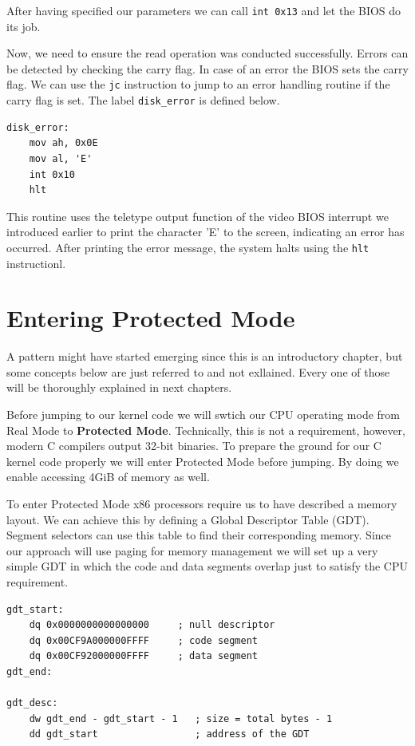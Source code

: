 After having specified our parameters we can call \texttt{int 0x13} and let the BIOS do its job.

Now, we need to ensure the read operation was conducted successfully. Errors can be detected by checking 
the carry flag. In case of an error the BIOS sets the carry flag. We can use the \texttt{jc} instruction 
to jump to an error handling routine if the carry flag is set. The label \texttt{disk\_error} is defined below.

\begin{lstlisting}[caption={Assembly to handle disk read errors}]
disk_error:
    mov ah, 0x0E
    mov al, 'E'
    int 0x10
    hlt
\end{lstlisting}

This routine uses the teletype output function of the video BIOS interrupt we introduced earlier
to print the character 'E' to the screen, indicating an error has occurred. After printing the error message,
the system halts using the \texttt{hlt} instructionl.

\section{Entering Protected Mode}

A pattern might have started emerging since this is an introductory chapter, but some concepts below are just referred
to and not exllained. Every one of those will be thoroughly explained in next chapters.

Before jumping to our kernel code we will swtich our CPU operating mode from Real Mode to \textbf{Protected Mode}.
Technically, this is not a requirement, however, modern C compilers output 32-bit binaries. To prepare the ground
for our C kernel code properly we will enter Protected Mode before jumping. By doing we enable accessing 4GiB of 
memory as well.

To enter Protected Mode x86 processors require us to have described a memory layout. We can achieve this by defining
a Global Descriptor Table (GDT). Segment selectors can use this table to find their corresponding memory. Since our
approach will use paging for memory management we will set up a very simple GDT in which the code and data segments
overlap just to satisfy the CPU requirement.

\begin{lstlisting}[caption={Defining a GDT}]
gdt_start:
    dq 0x0000000000000000     ; null descriptor
    dq 0x00CF9A000000FFFF     ; code segment
    dq 0x00CF92000000FFFF     ; data segment
gdt_end:

gdt_desc:
    dw gdt_end - gdt_start - 1   ; size = total bytes - 1
    dd gdt_start                 ; address of the GDT
\end{lstlisting}

